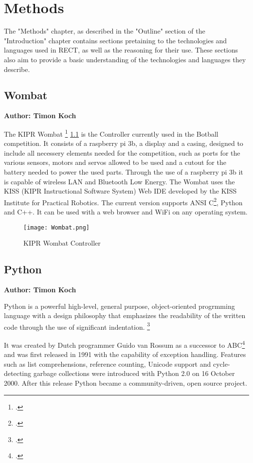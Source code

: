 \chapter{Methods}
The "Methods" chapter, as described in the "Outline" section of the "Introduction" chapter contains sections pretaining to the technologies and languages 
used in RECT, as well as the reasoning for their use. These sections also aim to provide a basic understanding of the technologies and languages they describe.

\section{Wombat}
\textbf{Author: Timon Koch}

The KIPR Wombat \footcite{wombat-controller} \ref{fig:wombat} is the Controller currently used in the Botball competition. It consists of a raspberry pi 3b, a display and a casing, designed to include all necessery elements needed for the competition, such as ports for the various sensors, motors and servos allowed to be used and a cutout for the battery needed to power the used parts. Through the use of a raspberry pi 3b it is capable of wireless LAN and Bluetooth Low Energy. The Wombat uses the KISS (KIPR Instructional Software System) Web IDE developed by the KISS Institute for Practical Robotics. The current version supports ANSI C\footcite{ansi_c_standard}, Python and C++. It can be used with a web browser and WiFi on any operating system.

\begin{figure}[h]
	\centering
	\texttt{[image: Wombat.png]} 
	\caption{KIPR Wombat Controller}
    \label{fig:wombat}
\end{figure}


\section{Python}
\textbf{Author: Timon Koch}

Python is a powerful high-level, general purpose, object-oriented progrmming language with a design philosophy that emphasizes the readability of the written code through the use of significant indentation. \footcite{python_main_site} 

It was created by Dutch programmer Guido van Rossum as a successor to ABC\footcite{abc_programming_language} and was first released in 1991 with the capability of exception handling. 
Features such as list comprehensions, reference counting, Unicode support and cycle-detecting garbage collections were introduced with Python 2.0 on 16 October 2000. After this release Python became a community-driven, open source project.

